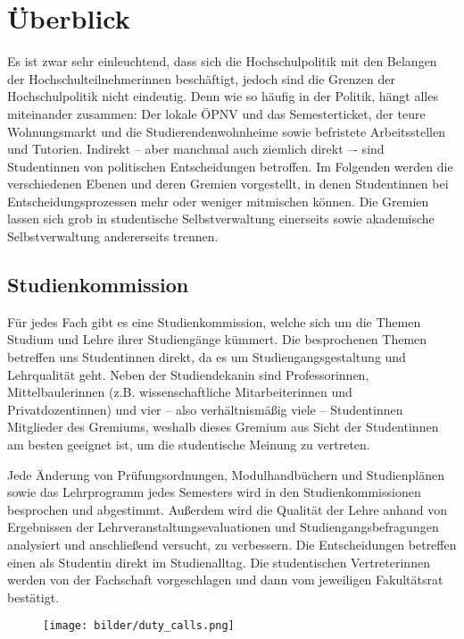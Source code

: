 \section{Überblick}
\label{hopo}



Es ist zwar sehr einleuchtend, dass sich die Hochschulpolitik mit den Belangen der Hochschulteilnehmerinnen beschäftigt, jedoch sind die Grenzen der Hochschulpolitik nicht eindeutig. Denn wie so häufig in der Politik, hängt alles miteinander zusammen: Der lokale ÖPNV und das Semesterticket, der teure Wohnungsmarkt und die Studierendenwohnheime sowie befristete Arbeitsstellen und Tutorien. Indirekt -- aber manchmal auch ziemlich direkt –- sind Studentinnen von politischen Entscheidungen betroffen. Im Folgenden werden die verschiedenen Ebenen und deren Gremien vorgestellt, in denen Studentinnen bei Entscheidungsprozessen mehr oder weniger mitmischen können. Die Gremien lassen sich grob in studentische Selbstverwaltung einerseits sowie akademische Selbstverwaltung andererseits trennen.


\subsection{Studienkommission}
Für jedes Fach gibt es eine Studien\-kom\-mis\-sion, welche sich um die Themen Studium und Lehre ihrer Studiengänge kümmert. Die besprochenen Themen betreffen uns Studentinnen direkt, da es um Studiengangsgestaltung und Lehrqualität geht. Neben der Studiendekanin sind Professorinnen, Mittelbaulerinnen (z.B. wissenschaftliche Mitarbeiterinnen und Privatdozentinnen) und vier -- also verhältnismäßig viele -- Studentinnen Mitglieder des Gremiums, weshalb dieses Gremium aus Sicht der Studentinnen am besten geeignet ist, um die studentische Meinung zu vertreten.

Jede Änderung von Prüfungsordnungen, Modulhandbüchern und Studienplänen sowie das Lehrprogramm jedes Semesters wird in den Studienkommissionen besprochen und abgestimmt. Außerdem wird die Qualität der Lehre anhand von Ergebnissen der Lehrveranstaltungsevaluationen und Studiengangsbefragungen analysiert und anschließend versucht, zu verbessern. Die Entscheidungen betreffen einen als Studentin direkt im Studienalltag. Die studentischen Vertreterinnen werden von der Fachschaft vorgeschlagen und dann vom jeweiligen Fakultätsrat bestätigt.

\begin{figure}[b]
    \centering
     \texttt{[image: bilder/duty\_calls.png]}
\end{figure}

